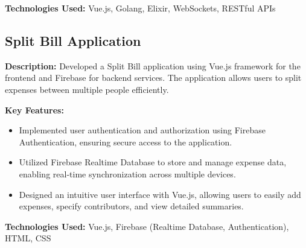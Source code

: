 \documentclass{resume} %
\newcommand{\plainitem}[1]{\item{#1}}
\begin{document}
\textbf{Technologies Used:} Vue.js, Golang, Elixir, WebSockets, RESTful APIs

\subsection*{Split Bill Application}

\textbf{Description:} Developed a Split Bill application using Vue.js framework for the frontend and Firebase for backend services. The application allows users to split expenses between multiple people efficiently.

\textbf{Key Features:}
\begin{itemize}
    \item Implemented user authentication and authorization using Firebase Authentication, ensuring secure access to the application.
    \item Utilized Firebase Realtime Database to store and manage expense data, enabling real-time synchronization across multiple devices.
    \item Designed an intuitive user interface with Vue.js, allowing users to easily add expenses, specify contributors, and view detailed summaries.
\end{itemize}

\textbf{Technologies Used:} Vue.js, Firebase (Realtime Database, Authentication), HTML, CSS




\end{document}
